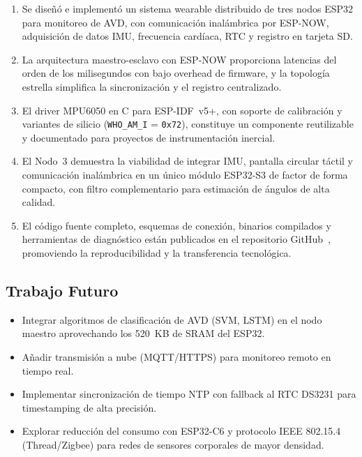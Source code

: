 \documentclass[10pt,twocolumn,a4paper]{article}
\begin{document}
\begin{enumerate}
  \item Se diseñó e implementó un sistema wearable distribuido de tres
        nodos ESP32 para monitoreo de AVD, con comunicación inalámbrica
        por ESP-NOW, adquisición de datos IMU, frecuencia cardíaca, RTC
        y registro en tarjeta SD.

  \item La arquitectura maestro-esclavo con ESP-NOW proporciona
        latencias del orden de los milisegundos con bajo overhead de
        firmware, y la topología estrella simplifica la sincronización
        y el registro centralizado.

  \item El driver MPU6050 en C para ESP-IDF~v5+, con soporte de
        calibración y variantes de silicio (\texttt{WHO\_AM\_I} =
        \texttt{0x72}), constituye un componente reutilizable y
        documentado para proyectos de instrumentación inercial.

  \item El Nodo~3 demuestra la viabilidad de integrar IMU, pantalla
        circular táctil y comunicación inalámbrica en un único módulo
        ESP32-S3 de factor de forma compacto, con filtro complementario
        para estimación de ángulos de alta calidad.

  \item El código fuente completo, esquemas de conexión, binarios
        compilados y herramientas de diagnóstico están publicados en
        el repositorio GitHub~\cite{repo_github}, promoviendo la
        reproducibilidad y la transferencia tecnológica.
\end{enumerate}

\subsection{Trabajo Futuro}

\begin{itemize}
  \item Integrar algoritmos de clasificación de AVD (SVM, LSTM) en
        el nodo maestro aprovechando los 520~KB de SRAM del ESP32.
  \item Añadir transmisión a nube (MQTT/HTTPS) para monitoreo remoto
        en tiempo real.
  \item Implementar sincronización de tiempo NTP con fallback al RTC
        DS3231 para timestamping de alta precisión.
  \item Explorar reducción del consumo con ESP32-C6 y protocolo
        IEEE 802.15.4 (Thread/Zigbee) para redes de sensores corporales
        de mayor densidad.
\end{itemize}
\end{document}
